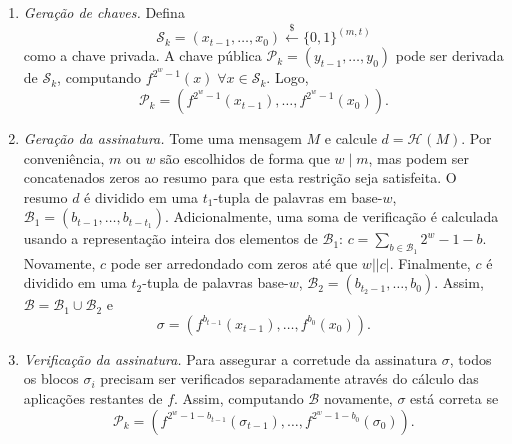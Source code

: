 \documentclass{ufsctex/ufsctex}
\newcommand{\pk}{\mathcal{P}_{k}}
\newcommand{\sk}{\mathcal{S}_{k}}
\newcommand{\bone}{\mathcal{B}_{1}}
\newcommand{\btwo}{\mathcal{B}_{2}}
\newcommand{\hash}[2][]{\mathcal{H}^{#1} (#2)}
\newcommand{\binwds}[1]{\{0, 1\}^{#1}}
\newcommand{\length}[1]{\vert{} #1 \vert{}}
\newcommand{\random}{\stackrel{\$}{\longleftarrow}}
\begin{document}
\begin{enumerate}

  \item[] \emph{Geração de chaves.} Defina
      \begin{equation}
        \sk{} = (x_{t - 1}, \dots, x_{0}) \random{} \binwds{(m, t)}
      \end{equation}
        como a chave privada. A chave pública $\pk{} = (y_{t - 1}, \dots,
        y_{0})$ pode ser derivada de $\sk{}$, computando $f^{2^{w}-1}(x) \;
        \forall x \in \sk{}$. Logo,
        \begin{equation}
          \pk{} = (f^{2^{w}-1}(x_{t - 1}), \dots, f^{2^{w}-1}(x_{0})).
        \end{equation}

  \item[] \emph{Geração da assinatura.} Tome uma mensagem $M$ e calcule $d =
      \hash{M}$. Por conveniência, $m$ ou $w$ são escolhidos de forma que $w
        \mid m$, mas podem ser concatenados zeros ao resumo para que esta
        restrição seja satisfeita. O resumo $d$ é dividido em uma $t_{1}$-tupla
        de palavras em base-$w$, $\bone = (b_{t - 1}, \dots, b_{t - t_{1}})$.
        Adicionalmente, uma soma de verificação é calculada usando a
        representação inteira dos elementos de $\bone{}$: $c = \sum_{b \in
        \bone{}} 2^{w} - 1 - b$. Novamente, $c$ pode ser arredondado com zeros
        até que $w \mid \length{c}$. Finalmente, $c$ é dividido em uma
        $t_{2}$-tupla de palavras base-$w$, $\btwo{} = (b_{t_{2}-1}, \dots,
        b_{0})$. Assim, $\mathcal{B} = \bone{} \cup \btwo{}$ e
        \begin{equation}
          \sigma = (f^{b_{t - 1}}(x_{t - 1}), \dots, f^{b_{0}}(x_{0})).
        \end{equation}

  \item[] \emph{Verificação da assinatura.} Para assegurar a corretude da
      assinatura $\sigma$, todos os blocos $\sigma_{i}$ precisam ser
        verificados separadamente através do cálculo das aplicações restantes
        de $f$. Assim, computando $\mathcal{B}$ novamente, $\sigma$ está
        correta se
        \begin{equation}
          \pk{} = (f^{2^{w} - 1 - b_{t - 1}}(\sigma_{t - 1}),
            \dots, f^{2^{w} - 1 - b_{0}}(\sigma_{0})).
        \end{equation}

\end{enumerate}
\end{document}
